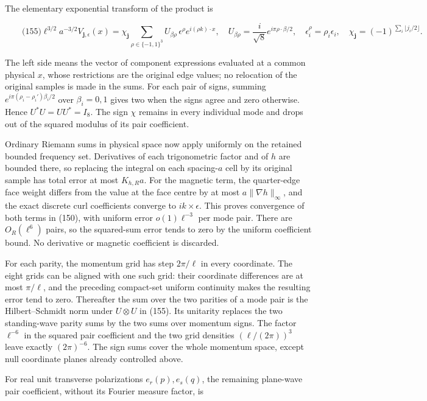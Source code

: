 The elementary exponential transform of the product is

\[
\qquad\text{(155)}
 \ell^{3/2}a^{-3/2}V_{\boldsymbol j,\epsilon}(x)
   =\chi_{\boldsymbol j}\sum_{\rho\in\{-1,1\}^3}
       U_{\beta\rho}\,\epsilon^\rho e^{i(\rho k)\cdot x},
 \quad U_{\beta\rho}=\frac{i}{\sqrt8}e^{i\pi\rho\cdot\beta/2},
 \quad \epsilon^\rho_i=\rho_i\epsilon_i,
 \quad \chi_{\boldsymbol j}=(-1)^{\sum_i\lfloor j_i/2\rfloor}.
\]

The left side means the vector of component expressions evaluated at a
common physical \(x\), whose restrictions are the original edge values;
no relocation of the original samples is made in the sums. For each pair
of signs, summing \(e^{i\pi(\rho_i-\rho_i')\beta_i/2}\) over
\(\beta_i=0,1\) gives two when the signs agree and zero otherwise. Hence
\(U^*U=UU^*=I_8\). The sign \(\chi\) remains in every individual mode
and drops out of the squared modulus of its pair coefficient.

Ordinary Riemann sums in physical space now apply uniformly on the
retained bounded frequency set. Derivatives of each trigonometric factor
and of \(h\) are bounded there, so replacing the integral on each
spacing-\(a\) cell by its original sample has total error at most
\(K_{h,R}a\). For the magnetic term, the quarter-edge face weight
differs from the value at the face centre by at most
\(a\|\nabla h\|_\infty\), and the exact discrete curl coefficients
converge to \(ik\times\epsilon\). This proves convergence of both terms
in (150), with uniform error \(o(1)\ell^{-3}\) per mode pair. There are
\(O_R(\ell^6)\) pairs, so the squared-sum error tends to zero by the
uniform coefficient bound. No derivative or magnetic coefficient is
discarded.

For each parity, the momentum grid has step \(2\pi/\ell\) in every
coordinate. The eight grids can be aligned with one such grid: their
coordinate differences are at most \(\pi/\ell\), and the preceding
compact-set uniform continuity makes the resulting error tend to zero.
Thereafter the sum over the two parities of a mode pair is the
Hilbert--Schmidt norm under \(U\otimes U\) in (155). Its unitarity
replaces the two standing-wave parity sums by the two sums over momentum
signs. The factor \(\ell^{-6}\) in the squared pair coefficient and the
two grid densities \((\ell/(2\pi))^3\) leave exactly \((2\pi)^{-6}\).
The sign sums cover the whole momentum space, except null coordinate
planes already controlled above.

For real unit transverse polarizations \(e_r(p),e_s(q)\), the remaining
plane-wave pair coefficient, without its Fourier measure factor, is

